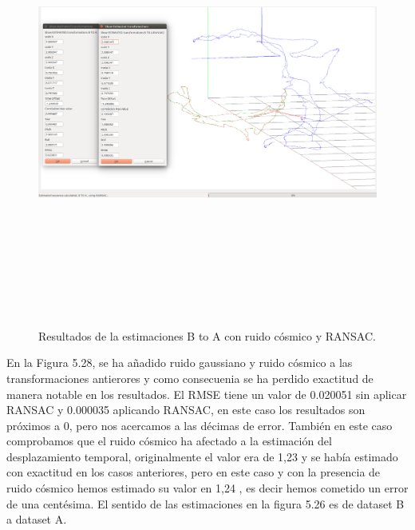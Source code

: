 \begin{figure}[H]
\begin{center}
\label{fig:opciones de View}\includegraphics[height=14.0cm,width=18.0cm]{img/cap6/newData_EscalaTraslaRotaGaussCosmic_ba.png}
\hspace{0.5cm}
\end{center}

\caption{Resultados de la estimaciones B to A con ruido cósmico y RANSAC.}
\end{figure}
En la Figura 5.28, se ha añadido ruido gaussiano y ruido cósmico a las transformaciones antierores y como consecuenia se ha perdido exactitud de manera notable en los resultados. 
El RMSE tiene un valor de 0.020051 sin aplicar RANSAC y 0.000035 aplicando RANSAC, en este caso los resultados son próximos a 0, pero nos acercamos a las décimas de error.
También en este caso comprobamos que el ruido cósmico ha afectado a la estimación del desplazamiento temporal, originalmente el valor era de 1,23 y se había estimado con exactitud en los casos anteriores, pero en este caso y con la presencia de ruido cósmico hemos estimado su valor en 1,24 , es decir hemos cometido un error de una centésima.
El sentido de las estimaciones en la figura 5.26 es de dataset B a dataset A.


